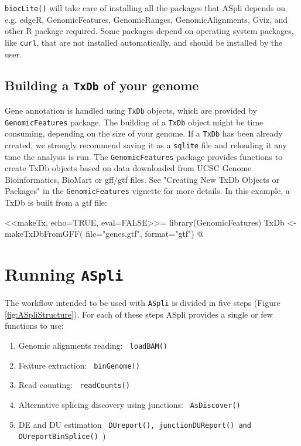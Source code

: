 \documentclass{article}
\begin{document}
\texttt{biocLite()} will take care of installing all the packages that ASpli 
depends on e.g. edgeR, GenomicFeatures, GenomicRanges, GenomicAlignments, Gviz, 
and other R package required. Some packages depend on operating system
packages, like \texttt{curl}, that are not installed automatically, and should
be installed by the user.

\subsection{Building a \texttt{TxDb} of your genome}
Gene annotation is handled using \texttt{TxDb} objects, which are provided by
\texttt{GenomicFeatures} package. The building of a \texttt{TxDb} object might 
be time consuming, depending on the size of your genome. If a \texttt{TxDb} has
been already created, we strongly recommend saving it as a \texttt{sqlite} file
and reloading it any time the analysis is run. The \texttt{GenomicFeatures} 
package provides functions to create TxDb objects based on data downloaded from
UCSC Genome Bioinformatics, BioMart or gff/gtf files. See "Creating New TxDb 
Objects or Packages" in the \texttt{GenomicFeatures} vignette for more details.
In this example, a TxDb is built from a gtf file:

<<makeTx, echo=TRUE, eval=FALSE>>=
library(GenomicFeatures)
TxDb <- makeTxDbFromGFF(
  file="genes.gtf",
  format="gtf")
@



\section{Running \texttt{ASpli}}

The workflow intended to be used with \texttt{ASpli} is divided in five
steps (Figure \ref{fig:ASpliStructure}). For each of these steps
ASpli provides a single or few functions to use:
\begin{enumerate}
  \item Genomic alignments reading: \texttt{ loadBAM() }
  \item Feature extraction: \texttt{ binGenome() }
  \item Read counting: \texttt{ readCounts() }
  \item Alternative splicing discovery using junctions: \texttt{ AsDiscover() }
  \item DE and DU estimation \texttt{ DUreport(), junctionDUReport() and
  DUreportBinSplice() })
\end{enumerate}
\end{document}
